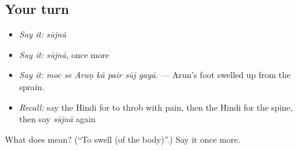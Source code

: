 \subsection*{Your turn}
\begin{itemize}
\raggedright
  \item \emph{Say it:} \emph{sūjnā}
  \item \emph{Say it:} \emph{sūjnā}, once more
  \item \emph{Say it:} \emph{moc se Aruṇ kā pair sūj gayā.} — Arun's foot swelled up from the sprain.
  \item \emph{Recall:} say the Hindi for to throb with pain, then the Hindi for the spine, then say \emph{sūjnā} again
\end{itemize}

\begin{tcolorbox}[breakable,colback=teal!4,colframe=teal!35!black,title={Before you move on}]
What does  mean? (\textquotedblleft{}To swell (of the body)\textquotedblright{}.) Say it once more.
\end{tcolorbox}
